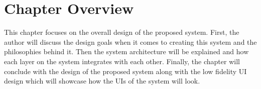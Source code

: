 \section{Chapter Overview}

This chapter focuses on the overall design of the proposed system. First, the author will discuss the design goals when it comes to creating this system and the philosophies behind it. Then the system architecture will be explained and how each layer on the system integrates with each other. Finally, the chapter will conclude with the design of the proposed system along with the low fidelity UI design which will showcase how the UIs of the system will look. 